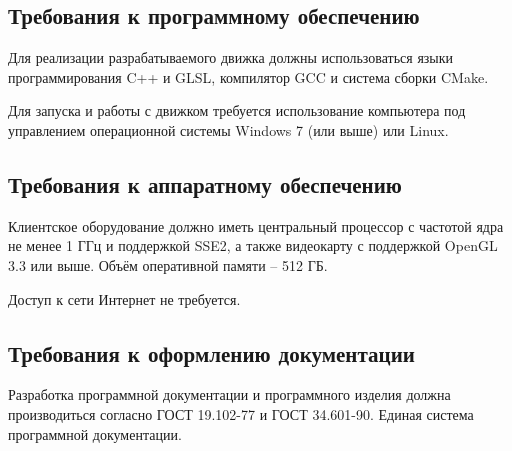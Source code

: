 \subsection{Требования к программному обеспечению}

Для реализации разрабатываемого движка должны использоваться языки программирования C++ и GLSL, компилятор GCC и система сборки CMake.

Для запуска и работы с движком требуется использование компьютера под управлением операционной системы Windows 7 (или выше) или Linux.

\subsection{Требования к аппаратному обеспечению}

Клиентское оборудование должно иметь центральный процессор с частотой ядра не менее 1 ГГц и поддержкой SSE2, а также видеокарту с поддержкой OpenGL 3.3 или выше. Объём оперативной памяти -- 512 ГБ.

Доступ к сети Интернет не требуется.

\subsection{Требования к оформлению документации}

Разработка программной документации и программного изделия должна производиться согласно ГОСТ 19.102-77 и ГОСТ 34.601-90. Единая система программной документации.

